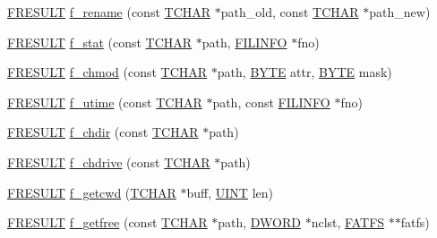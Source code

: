 \begin{DoxyCompactItemize}
\item 
\hyperlink{ff_8h_a49d0171ecbd362cda5680a0d360db44c}{F\+R\+E\+S\+U\+L\+T} \hyperlink{ff_8h_aa775b9b024acfeb3a66523cab497d142}{f\+\_\+rename} (const \hyperlink{ff_8h_a03bdb8ce5895c7e261aadc2529637546}{T\+C\+H\+A\+R} $\ast$path\+\_\+old, const \hyperlink{ff_8h_a03bdb8ce5895c7e261aadc2529637546}{T\+C\+H\+A\+R} $\ast$path\+\_\+new)
\item 
\hyperlink{ff_8h_a49d0171ecbd362cda5680a0d360db44c}{F\+R\+E\+S\+U\+L\+T} \hyperlink{ff_8h_abe1f60daab5c7d11170c334fb832c798}{f\+\_\+stat} (const \hyperlink{ff_8h_a03bdb8ce5895c7e261aadc2529637546}{T\+C\+H\+A\+R} $\ast$path, \hyperlink{struct_f_i_l_i_n_f_o}{F\+I\+L\+I\+N\+F\+O} $\ast$fno)
\item 
\hyperlink{ff_8h_a49d0171ecbd362cda5680a0d360db44c}{F\+R\+E\+S\+U\+L\+T} \hyperlink{ff_8h_a9ee7e560eec8d82755c636ae41e702cd}{f\+\_\+chmod} (const \hyperlink{ff_8h_a03bdb8ce5895c7e261aadc2529637546}{T\+C\+H\+A\+R} $\ast$path, \hyperlink{integer_8h_a4ae1dab0fb4b072a66584546209e7d58}{B\+Y\+T\+E} attr, \hyperlink{integer_8h_a4ae1dab0fb4b072a66584546209e7d58}{B\+Y\+T\+E} mask)
\item 
\hyperlink{ff_8h_a49d0171ecbd362cda5680a0d360db44c}{F\+R\+E\+S\+U\+L\+T} \hyperlink{ff_8h_aafaa718d1a487e12a8f0087173dba0b9}{f\+\_\+utime} (const \hyperlink{ff_8h_a03bdb8ce5895c7e261aadc2529637546}{T\+C\+H\+A\+R} $\ast$path, const \hyperlink{struct_f_i_l_i_n_f_o}{F\+I\+L\+I\+N\+F\+O} $\ast$fno)
\item 
\hyperlink{ff_8h_a49d0171ecbd362cda5680a0d360db44c}{F\+R\+E\+S\+U\+L\+T} \hyperlink{ff_8h_a53c7e9a7fb3c279254cd2d0445667e2f}{f\+\_\+chdir} (const \hyperlink{ff_8h_a03bdb8ce5895c7e261aadc2529637546}{T\+C\+H\+A\+R} $\ast$path)
\item 
\hyperlink{ff_8h_a49d0171ecbd362cda5680a0d360db44c}{F\+R\+E\+S\+U\+L\+T} \hyperlink{ff_8h_a13e5933f851b436890361189f64261cd}{f\+\_\+chdrive} (const \hyperlink{ff_8h_a03bdb8ce5895c7e261aadc2529637546}{T\+C\+H\+A\+R} $\ast$path)
\item 
\hyperlink{ff_8h_a49d0171ecbd362cda5680a0d360db44c}{F\+R\+E\+S\+U\+L\+T} \hyperlink{ff_8h_acb865a03dbac0031ac5cb8a031f7b71c}{f\+\_\+getcwd} (\hyperlink{ff_8h_a03bdb8ce5895c7e261aadc2529637546}{T\+C\+H\+A\+R} $\ast$buff, \hyperlink{integer_8h_a36cb3b01d81ffd844bbbfb54003e06ec}{U\+I\+N\+T} len)
\item 
\hyperlink{ff_8h_a49d0171ecbd362cda5680a0d360db44c}{F\+R\+E\+S\+U\+L\+T} \hyperlink{ff_8h_a0ff39f75a87cbda9cd6ea65d83f16cec}{f\+\_\+getfree} (const \hyperlink{ff_8h_a03bdb8ce5895c7e261aadc2529637546}{T\+C\+H\+A\+R} $\ast$path, \hyperlink{integer_8h_ad342ac907eb044443153a22f964bf0af}{D\+W\+O\+R\+D} $\ast$nclst, \hyperlink{struct_f_a_t_f_s}{F\+A\+T\+F\+S} $\ast$$\ast$fatfs)
$$
\end{DoxyCompactItemize}
